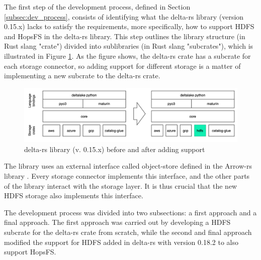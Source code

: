 
The first step of the development process, defined in Section \ref{subsec:dev_process}, consists of identifying what the delta-rs library (version 0.15.x) lacks to satisfy the requirements, more specifically, how to support \gls{HDFS} and \gls{HopsFS} in the delta-rs \cite{DeltaioDeltars2024} library. This step outlines the library structure (in Rust slang "crate") divided into sublibraries (in Rust slang "subcrates"), which is illustrated in Figure \ref{fig:delta-rs_schema}. As the figure shows, the delta-rs crate has a subcrate for each storage connector, so adding support for different storage is a matter of implementing a new subcrate to the delta-rs crate.

\begin{figure}[!ht]
    \begin{center}
      \includegraphics[width=\textwidth]{figures/4-implementation/delta-rs_schema.png}
    \caption{delta-rs library (v. 0.15.x) before and after adding  support}
    \label{fig:delta-rs_schema}
    \end{center}
\end{figure}

The library uses an external interface called object-store defined in the Arrow-rs library \cite{ArrowrsObject_storeREADMEmd}. Every storage connector implements this interface, and the other parts of the library interact with the storage layer. It is thus crucial that the new \gls{HDFS} storage also implements this interface.

The development process was divided into two subsections: a first approach and a final approach. The first approach was carried out by developing a \gls{HDFS} subcrate for the delta-rs crate from scratch, while the second and final approach modified the support for \gls{HDFS} added in delta-rs with version 0.18.2 to also support \gls{HopsFS}.

